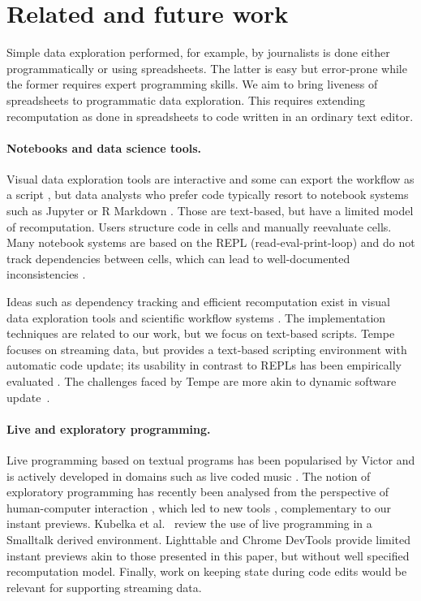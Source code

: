 \documentclass[english,crc]{programming}
\theoremstyle{plain}
\theoremstyle{definition}
\begin{document}

\section{Related and future work}
\label{sec:future}

Simple data exploration performed, for example, by journalists \cite{ddj} is done either
programmatically or using spreadsheets. The latter is easy but error-prone while the former
requires expert programming skills. We aim to bring liveness of spreadsheets to programmatic
data exploration. This requires extending recomputation as done in spreadsheets \cite{spreadsheet}
to code written in an ordinary text editor.

\paragraph{Notebooks and data science tools.}
Visual data exploration tools are interactive \cite{control,tableau,vizdom} and some
can export the workflow as a script \cite{wrangler}, but data analysts who prefer code
typically resort to notebook systems such as Jupyter or R Markdown \cite{jupyter,rmarkdown}.
Those are text-based, but have a limited model of recomputation. Users structure code in
cells and manually reevaluate cells. Many notebook systems are based on the REPL (read-eval-print-loop)
\cite{lisp,drscheme} and do not track dependencies between cells, which can lead to well-documented
inconsistencies \cite{dataflow,noworkflow,wrattler}.

Ideas such as dependency tracking and efficient recomputation exist in visual data exploration tools
\cite{control,tableau,vizdom} and scientific workflow systems \cite{taverna,kepler}. The
implementation techniques are related to our work, but we focus on text-based scripts.
Tempe \cite{tempe} focuses on streaming data, but provides a text-based scripting environment
with automatic code update; its usability in contrast to REPLs has been empirically
evaluated \cite{ripple}. The challenges faced by Tempe are more akin to dynamic software update~\cite{dsu}.

\paragraph{Live and exploratory programming.}
Live programming based on textual programs has been popularised by Victor \cite{principle,learnable} and
is actively developed in domains such as live coded music \cite{beyond,sonic}.
The notion of exploratory programming has recently been analysed from the perspective of
human-computer interaction \cite{exploratory}, which led to new tools \cite{variolite},
complementary to our instant previews. Kubelka et al.~\cite{liveroad}
review the use of live programming in a Smalltalk derived environment. Lighttable \cite{lighttable}
and Chrome DevTools provide limited instant previews akin to those presented in this paper,
but without well specified recomputation model. Finally, work on keeping state during
code edits \cite{alive,livingit} would be relevant for supporting streaming data.
\end{document}
